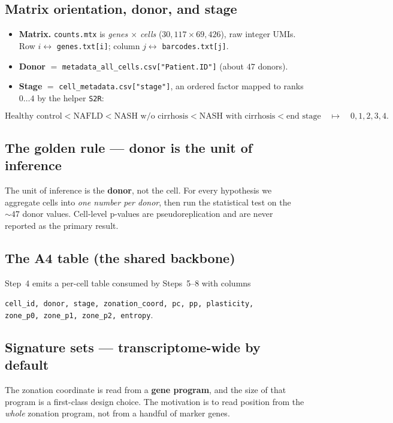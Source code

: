 \documentclass[11pt]{article}
\newcommand{\code}[1]{\texttt{\small #1}}
\begin{document}
\subsection{Matrix orientation, donor, and stage}
\begin{itemize}[leftmargin=1.4em]
  \item \textbf{Matrix.} \code{counts.mtx} is \emph{genes $\times$ cells}
        ($30{,}117 \times 69{,}426$), raw integer UMIs. Row $i \leftrightarrow$
        \code{genes.txt[i]}; column $j \leftrightarrow$ \code{barcodes.txt[j]}.
  \item \textbf{Donor} $=$ \code{metadata\_all\_cells.csv["Patient.ID"]} (about $47$ donors).
  \item \textbf{Stage} $=$ \code{cell\_metadata.csv["stage"]}, an ordered factor mapped to ranks
        $0\ldots4$ by the helper \code{S2R}:
\end{itemize}

\[
\text{Healthy control} < \text{NAFLD} < \text{NASH w/o cirrhosis}
< \text{NASH with cirrhosis} < \text{end stage}
\quad\longmapsto\quad 0,1,2,3,4 .
\]

\subsection{The golden rule --- donor is the unit of inference}
The unit of inference is the \textbf{donor}, not the cell. For every hypothesis we
aggregate cells into \emph{one number per donor}, then run the statistical test on the
$\sim\!47$ donor values. Cell-level p-values are pseudoreplication and are never reported as
the primary result.

\subsection{The A4 table (the shared backbone)}
Step~4 emits a per-cell table consumed by Steps~5--8 with columns

\begin{center}
\code{cell\_id, donor, stage, zonation\_coord, pc, pp, plasticity,}\\
\code{zone\_p0, zone\_p1, zone\_p2, entropy}.
\end{center}

\subsection{Signature sets --- transcriptome-wide by default}
\label{sec:sigsets}
The zonation coordinate is read from a \textbf{gene program}, and the size of that program is a
first-class design choice. The motivation is to read position from the \emph{whole} zonation
program, not from a handful of marker genes.
\end{document}
